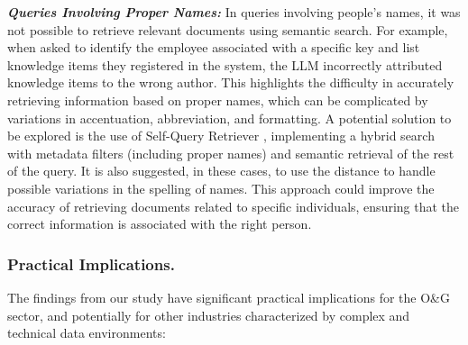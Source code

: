                 
                \textbf{\textit{Queries Involving Proper Names:}}
                    In queries involving people's names, it was not possible to retrieve relevant documents using semantic search. 
                    For example, when asked to identify the employee associated with a specific key and list knowledge items they registered in the system, the LLM incorrectly attributed knowledge items to the wrong author. 
                    This highlights the difficulty in accurately retrieving information based on proper names, which can be complicated by variations in accentuation, abbreviation, and formatting.
                    A potential solution to be explored is the use of Self-Query Retriever \citep{LangchainSelfQuery2023}, implementing a hybrid search with metadata filters (including proper names) and semantic retrieval of the rest of the query. 
                    It is also suggested, in these cases, to use the \citep{Levenshtein1966} distance to handle possible variations in the spelling of names. 
                    This approach could improve the accuracy of retrieving documents related to specific individuals, ensuring that the correct information is associated with the right person.
                    
            
            \subsubsection{Practical Implications.} 

                The findings from our study have significant practical implications for the O\&G sector, and potentially for other industries characterized by complex and technical data environments:
                    
